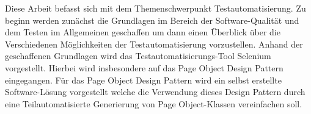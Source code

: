 \label{sec:zusammenfassung}
Diese Arbeit befasst sich mit dem Themenschwerpunkt Testautomatisierung.
Zu beginn werden zunächst die Grundlagen im Bereich der Software-Qualität und dem Testen im Allgemeinen geschaffen um dann einen Überblick über die Verschiedenen Möglichkeiten der Testautomatisierung vorzustellen.
Anhand der geschaffenen Grundlagen wird das Testautomatisierungs-Tool Selenium vorgestellt. Hierbei wird insbesondere auf das Page Object Design Pattern eingegangen. Für das Page Object Design Pattern wird ein selbst erstellte Software-Lösung vorgestellt welche die Verwendung dieses Design Pattern durch eine Teilautomatisierte Generierung von Page Object-Klassen vereinfachen soll.
